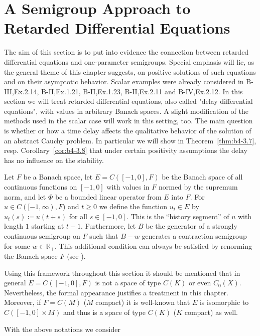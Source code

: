 \section{A Semigroup Approach to Retarded Differential Equations}
%	
The aim of this section is to put into evidence the connection between retarded differential equations and one-parameter semigroups.
Special emphasis will lie, as the general theme of this chapter suggests, on positive solutions of such equations and on their asymptotic behavior.
Scalar examples were already considered in B-III,Ex.2.14, B-II,Ex.1.21, B-II,Ex.1.23, B-II,Ex.2.11 and B-IV,Ex.2.12.
In this section we will treat retarded differential equations, also called "delay differential equations", with values in arbitrary Banach spaces.
A slight modification of the methods used in the scalar case will work in this setting, too.
The main question is whether or how a time delay affects the qualitative behavior of the solution of an abstract Cauchy problem.
In particular we will show in Theorem~\ref{thm:b4-3.7}, resp. Corollary~\ref{cor:b4-3.8} that under certain positivity assumptions the delay has no influence on the stability.

Let $F$ be a Banach space, let $E = C([-1,0],F)$ be the Banach space of all continuous functions on $[-1,0]$ with values in $F$ normed by the supremum norm, and let $\Phi$ be a bounded linear operator from $E$ into $F$.
For $u \in C([-1,\infty),F)$ and $t \geq 0$ we define the function $u_{t} \in E$ by $u_{t}(s) \coloneq  u(t+s)$ for all $s \in [-1,0]$.
This is the \enquote{history segment} of $u$ with length $1$ starting at $t-1$.
Furthermore, let $B$ be the generator of a strongly continuous semigroup on $F$ such that $B - w$ generates a contraction semigroup for some $w \in \mathbb{R}_{+}$.
This additional condition can always be satisfied by renorming the Banach space $F$ (see ).

Using this framework throughout this section it should be mentioned that in general $E = C([-1,0],F)$ is not a space of type $C(K)$ or even $C_{0}(X)$.
Nevertheless, the formal appearance justifies a treatment in this chapter.
Moreover, if $F = C(M)$ ($M$ compact) it is well-known that $E$ is isomorphic to $C([-1,0] \times M)$ and thus is a space of type $C(K)$ ($K$ compact) as well.

With the above notations we consider\\

